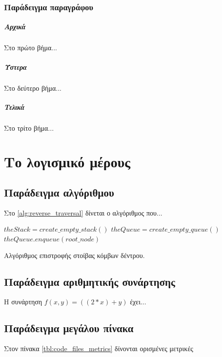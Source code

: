 \documentclass[12pt,a4paper]{report}%
\begin{document}
\subsection{Παράδειγμα παραγράφου}

\paragraph{Αρχικά}
Στο πρώτο βήμα...


\paragraph{Ύστερα}
Στο δεύτερο βήμα...

\paragraph{Τελικά}
Στο τρίτο βήμα...

\chapter{Το λογισμικό μέρους}

\section{Παράδειγμα αλγόριθμου}
Στο \ref{alg:reverse_traversal} δίνεται ο αλγόριθμος που...

\begin{algorithm}[h!]
\SetAlgoLined
\label{alg:reverse_traversal}
 $theStack = create\_empty\_stack()$\;
 $theQueue = create\_empty\_queue()$\;
 $theQueue.enqueue(root\_node)$\;
 \caption{Αλγόριθμος επιστροφής στοίβας κόμβων δέντρου.}
\end{algorithm}


\section{Παράδειγμα αριθμητικής συνάρτησης}
Η συνάρτηση $f(x,y)=((2*x)+y)$ έχει...



\section{Παράδειγμα μεγάλου πίνακα}
Στον πίνακα \ref{tbl:code_files_metrics} δίνονται ορισμένες μετρικές
\end{document}
